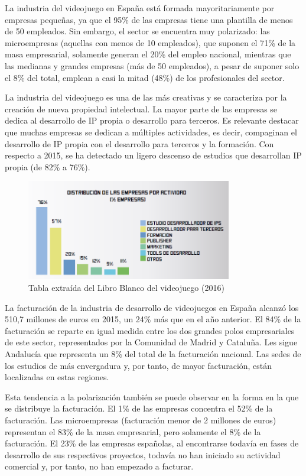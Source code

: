 La industria del videojuego en España está formada mayoritariamente por empresas pequeñas, ya que el 95\% de las empresas tiene una plantilla de menos de 50 empleados. Sin embargo, el sector se encuentra muy polarizado: las microempresas (aquellas con menos de 10 empleados), que suponen el 71\% de la masa empresarial, solamente generan el 20\% del empleo nacional, mientras que las medianas y grandes empresas (más de 50 empleados), a pesar de suponer solo el 8\% del total, emplean a casi la mitad (48\%) de los profesionales del sector.

La industria del videojuego es una de las más creativas y se caracteriza por la creación de nueva propiedad intelectual. La mayor parte de las empresas se dedica al desarrollo de IP propia o desarrollo para terceros. Es relevante destacar que muchas empresas se dedican a múltiples actividades, es decir, compaginan el desarrollo de IP propia con el desarrollo para terceros y la formación. Con respecto a 2015, se ha detectado un ligero descenso de estudios que desarrollan IP propia (de 82\% a 76\%).

\begin{figure}[h]
    \centering
    \includegraphics[width=0.8\textwidth]{images/estadodelarte/mercado/desarrollo-ip}
    \caption{Tabla extraída del Libro Blanco del videojuego (2016)}
\end{figure}

La facturación de la industria de desarrollo de videojuegos en España alcanzó los 510,7 millones de euros en 2015, un 24\% más que en el año anterior. El 84\% de la facturación se reparte en igual medida entre los dos grandes polos empresariales de este sector, representados por la Comunidad de Madrid y Cataluña. Les sigue Andalucía que representa un 8\% del total de la facturación nacional. Las sedes de los estudios de más envergadura y, por tanto, de mayor facturación, están localizadas en estas regiones.

Esta tendencia a la polarización también se puede observar en la forma en la que se distribuye la facturación. El 1\% de las empresas concentra el 52\% de la facturación. Las microempresas (facturación menor de 2 millones de euros) representan el 83\% de la masa empresarial, pero solamente el 8\% de la facturación. El 23\% de las empresas españolas, al encontrarse todavía en fases de desarrollo de sus respectivos proyectos, todavía no han iniciado su actividad comercial y, por tanto, no han empezado a facturar.

